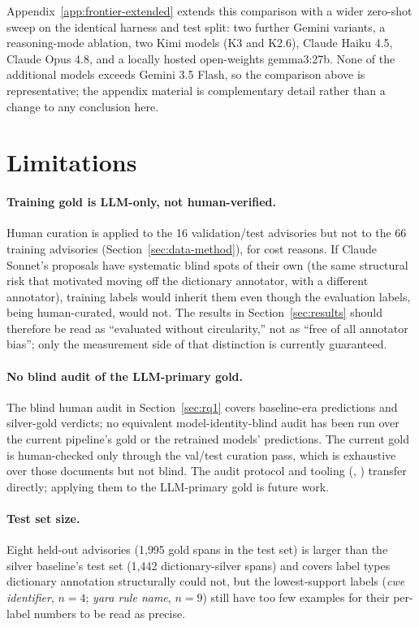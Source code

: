 \documentclass[11pt]{article}
\begin{document}
Appendix~\ref{app:frontier-extended} extends this comparison with a wider
zero-shot sweep on the identical harness and test split: two further
Gemini variants, a reasoning-mode ablation, two Kimi models (K3 and
K2.6), Claude Haiku 4.5, Claude Opus 4.8, and a locally hosted
open-weights gemma3:27b. None of
the additional models exceeds Gemini 3.5 Flash, so the comparison above
is representative; the appendix material is complementary detail rather
than a change to any conclusion here.

\section{Limitations}
\label{sec:limitations}

\paragraph{Training gold is LLM-only, not human-verified.} Human curation
is applied to the 16 validation/test advisories but not to the 66 training
advisories (Section~\ref{sec:data-method}), for cost reasons. If Claude
Sonnet's proposals have systematic blind spots of their own (the same
structural risk that motivated moving off the dictionary annotator, with a
different annotator), training labels would inherit them even though the
evaluation labels, being human-curated, would not. The results in
Section~\ref{sec:results} should therefore be read as ``evaluated without
circularity,'' not as ``free of all annotator bias''; only the measurement
side of that distinction is currently guaranteed.

\paragraph{No blind audit of the LLM-primary gold.} The blind human audit
in Section~\ref{sec:rq1} covers baseline-era predictions and silver-gold
verdicts; no equivalent model-identity-blind audit has been run over the
current pipeline's gold or the retrained models' predictions. The current
gold is human-checked only through the val/test curation pass, which is
exhaustive over those documents but not blind. The audit protocol and
tooling (, ) transfer
directly; applying them to the LLM-primary gold is future work.

\paragraph{Test set size.} Eight held-out advisories (1{,}995 gold spans in
the test set) is larger than the silver baseline's test set (1{,}442
dictionary-silver spans) and covers label types dictionary annotation
structurally could not, but the lowest-support labels (\emph{cwe
identifier}, $n=4$; \emph{yara rule name}, $n=9$) still have too few
examples for their per-label numbers to be read as precise.
\end{document}

